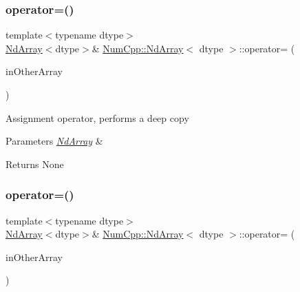 \subsubsection{\texorpdfstring{operator=()}{operator=()}\hspace{0.1cm}{\footnotesize\ttfamily [1/2]}}
{\footnotesize\ttfamily template$<$typename dtype$>$ \\
\mbox{\hyperlink{class_num_cpp_1_1_nd_array}{Nd\+Array}}$<$dtype$>$\& \mbox{\hyperlink{class_num_cpp_1_1_nd_array}{Num\+Cpp\+::\+Nd\+Array}}$<$ dtype $>$\+::operator= (\begin{DoxyParamCaption}\item[{const \mbox{\hyperlink{class_num_cpp_1_1_nd_array}{Nd\+Array}}$<$ dtype $>$ \&}]{in\+Other\+Array }\end{DoxyParamCaption})\hspace{0.3cm}{\ttfamily [inline]}}

Assignment operator, performs a deep copy


\begin{DoxyParams}{Parameters}
{\em \mbox{\hyperlink{class_num_cpp_1_1_nd_array}{Nd\+Array}}} & \\
\hline
\end{DoxyParams}
\begin{DoxyReturn}{Returns}
None 
\end{DoxyReturn}
\mbox{\label{class_num_cpp_1_1_nd_array_a729a494e63df95209e09daa0736165a2}} 
\subsubsection{\texorpdfstring{operator=()}{operator=()}\hspace{0.1cm}{\footnotesize\ttfamily [2/2]}}
{\footnotesize\ttfamily template$<$typename dtype$>$ \\
\mbox{\hyperlink{class_num_cpp_1_1_nd_array}{Nd\+Array}}$<$dtype$>$\& \mbox{\hyperlink{class_num_cpp_1_1_nd_array}{Num\+Cpp\+::\+Nd\+Array}}$<$ dtype $>$\+::operator= (\begin{DoxyParamCaption}\item[{\mbox{\hyperlink{class_num_cpp_1_1_nd_array}{Nd\+Array}}$<$ dtype $>$ \&\&}]{in\+Other\+Array }\end{DoxyParamCaption})\hspace{0.3cm}{\ttfamily [inline]}}

